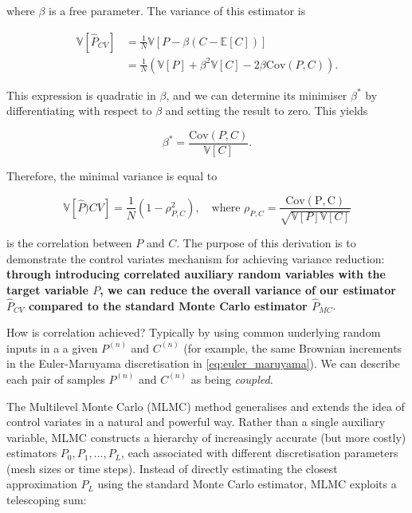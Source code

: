 where $\beta$ is a free parameter. The variance of this estimator is

\begin{align*}
    \mathbb{V}[\hat{P}_{CV}] &= \frac{1}{N}\mathbb{V}[P - \beta(C-\mathbb{E}[C])] \\
     &= \frac{1}{N}\left(\mathbb{V}[P] + \beta^2\mathbb{V}[C] - 2\beta\mathrm{Cov}(P,C)\right).
\end{align*}

This expression is quadratic in $\beta$, and we can determine its minimiser $\beta^*$
by differentiating with respect to $\beta$ and setting the result to zero. This yields

\begin{equation*}
    \beta^* = \frac{\mathrm{Cov}(P, C)}{\mathbb{V}[C]}.
\end{equation*}

Therefore, the minimal variance is equal to

\begin{equation*}
    \mathbb{V}[\hat{P}){CV}] = \frac{1}{N} \left(1 - \rho_{P,C}^2\right), 
    \quad \text{where } \rho_{P,C} = \frac{\mathrm{Cov(P,C)}}{\sqrt{\mathbb{V}[P]\mathbb{V}[C]}}
\end{equation*}

is the correlation between $P$ and $C$. The purpose of this derivation is to demonstrate the control variates
mechanism for achieving variance reduction: \textbf{through introducing correlated auxiliary random 
variables with the target variable $P$, we can reduce the overall variance of our estimator $\hat{P}_{CV}$ 
compared to the standard Monte Carlo estimator $\hat{P}_{MC}$}.

How is correlation achieved? Typically by using common underlying random inputs in a 
a given $P^{(n)}$ and $C^{(n)}$ (for example, the 
same Brownian increments in the Euler-Maruyama discretisation in \eqref{eq:euler_maruyama}).
We can describe each pair of samples $P^{(n)}$ and $C^{(n)}$ as being \textit{coupled}.

The Multilevel Monte Carlo (MLMC) method generalises and extends the idea of control variates in a natural and 
powerful way. Rather than a single auxiliary variable, MLMC constructs a hierarchy of increasingly 
accurate (but more costly) estimators $P_0, P_1, \dots, P_L$, each associated with different discretisation 
parameters (mesh sizes or time steps). Instead of directly estimating the closest approximation $P_L$ 
using the standard Monte Carlo estimator, 
MLMC exploits a telescoping sum:

